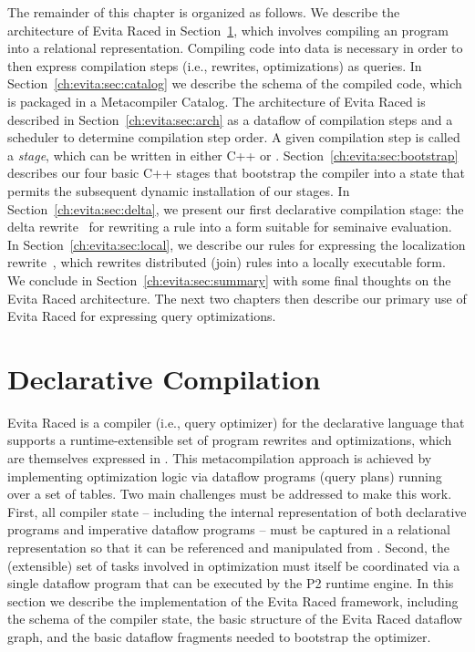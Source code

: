 The remainder of this chapter is organized as follows.  We describe the
architecture of Evita Raced in Section~\ref{ch:evita:sec:compile}, which
involves compiling an \OVERLOG program into a relational representation.
Compiling code into data is necessary in order to then express compilation
steps (i.e., rewrites, optimizations) as queries.  In
Section~\ref{ch:evita:sec:catalog} we describe the schema of the compiled code,
which is packaged in a Metacompiler Catalog.  The architecture of Evita Raced
is described in Section~\ref{ch:evita:sec:arch} as a dataflow of compilation
steps and a scheduler to determine compilation step order.  A given compilation
step is called a {\em stage}, which can be written in either C++ or \OVERLOG.
Section~\ref{ch:evita:sec:bootstrap} describes our four basic C++ stages that
bootstrap the compiler into a state that permits the subsequent dynamic
installation of our \OVERLOG stages.  In Section~\ref{ch:evita:sec:delta}, we
present our first declarative compilation stage: the delta
rewrite~\cite{loo-sigmod06} for rewriting a rule into a form suitable for
seminaive evaluation.  In Section~\ref{ch:evita:sec:local}, we describe our
\OVERLOG rules for expressing the localization rewrite~\cite{p2:sosp}, which
rewrites distributed (join) rules into a locally executable form.  We conclude
in Section~\ref{ch:evita:sec:summary} with some final thoughts on the Evita
Raced architecture.  The next two chapters then describe our primary use of
Evita Raced for expressing query optimizations.

\section{Declarative Compilation}
\label{ch:evita:sec:compile}

Evita Raced is a compiler (i.e., query optimizer) for the \OVERLOG declarative
language that supports a runtime-extensible set of program rewrites and
optimizations, which are themselves expressed in \OVERLOG.  This
metacompilation approach is achieved by implementing optimization logic via
dataflow programs (query plans) running over a set of tables.  Two main
challenges must be addressed to make this work.  First, all compiler state --
including the internal representation of both declarative \OVERLOG programs and
imperative dataflow programs -- must be captured in a relational representation
so that it can be referenced and manipulated from \OVERLOG.  Second, the
(extensible) set of tasks involved in optimization must itself be coordinated
via a single dataflow program that can be executed by the P2 runtime engine.
In this section we describe the implementation of the Evita Raced framework,
including the schema of the compiler state, the basic structure of the Evita
Raced dataflow graph, and the basic dataflow fragments needed to bootstrap the
optimizer.

